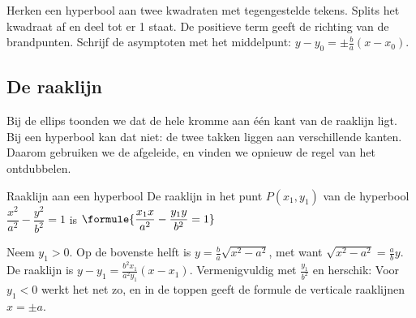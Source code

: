 \begin{werkwijze}
Herken een hyperbool aan twee kwadraten met tegengestelde tekens. Splits het kwadraat af en deel tot er 1 staat. De positieve term geeft de richting van de brandpunten. Schrijf de asymptoten met het middelpunt: $y - y_0 = \pm\tfrac ba(x - x_0)$.
\end{werkwijze}


\begin{oefeningen}
\end{oefeningen}

\subsection{De raaklijn}

Bij de ellips toonden we dat de hele kromme aan één kant van de raaklijn ligt. Bij een hyperbool kan dat niet: de twee takken liggen aan verschillende kanten. Daarom gebruiken we de afgeleide, en vinden we opnieuw de regel van het ontdubbelen.

\begin{theorie}
\begin{stelling}{Raaklijn aan een hyperbool}
De raaklijn in het punt $P(x_1, y_1)$ van de hyperbool $\dfrac{x^2}{a^2} - \dfrac{y^2}{b^2} = 1$ is \qquad $\formule{\dfrac{x_1x}{a^2} - \dfrac{y_1y}{b^2} = 1}$
\end{stelling}

\begin{bewijs}
Neem $y_1 > 0$. Op de bovenste helft is $y = \tfrac ba\sqrt{x^2 - a^2}$, met
want $\sqrt{x^2 - a^2} = \tfrac ab y$. De raaklijn is $y - y_1 = \tfrac{b^2x_1}{a^2y_1}(x - x_1)$. Vermenigvuldig met $\tfrac{y_1}{b^2}$ en herschik:
Voor $y_1 < 0$ werkt het net zo, en in de toppen geeft de formule de verticale raaklijnen $x = \pm a$.
\end{bewijs}
\end{theorie}


